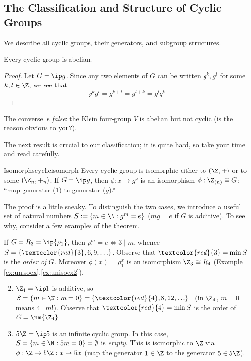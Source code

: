 \clearpage




\subsection{The Classification and Structure of Cyclic Groups}\label{sec:cyclicclass}

We describe all cyclic groups, their generators, and subgroup structures.

\begin{lemm}{}{}
	Every cyclic group is abelian.
\end{lemm}

\begin{proof}
	Let $G=\ip g$. Since any two elements of $G$ can be written $g^k,g^l$ for some $k,l\in\Z$, we see that
	\[
		g^kg^l=g^{k+l}=g^{l+k}=g^lg^k\tag*{\qedhere}
	\]
\end{proof}

The converse is \emph{false}: the Klein four-group $V$ is abelian but not cyclic (is the reason obvious to you?).\smallbreak

The next result is crucial to our classification; it is quite hard, so take your time and read carefully.


\begin{thm}{Isomorphs}{cyclicisomorph}
	Every cyclic group is isomorphic either to $(\Z,+)$ or to some $(\Z_n,+_n)$.\smallbreak
	If $G=\ip g$, then $\phi:x\mapsto g^x$ is an isomorphism $\phi:\Z_{(n)}\cong G$: ``map generator (1) to generator ($g$).''
\end{thm}

The proof is a little sneaky. To distinguish the two cases, we introduce a useful set of natural numbers $S:=\{m\in\N:g^m=e\}$ ($mg=e$ if $G$ is additive). To see why, consider a few examples of the theorem.

\begin{examples}{}{}
	\exstart If $G=R_3=\ip{\rho_1}$, then $\rho_1^m=e\iff 3\mid m$, whence $S=\{\textcolor{red}{3},6,9,\ldots\}$. Observe that $\textcolor{red}{3}=\min S$ is the \emph{order of $G$.} Moreover $\phi(x)=\rho_1^x$ is an isomorphism $\Z_3\cong R_4$ (Example \ref*{ex:unisoex}.\ref{ex:unisoex2}).
	\begin{enumerate}\setcounter{enumi}{1}
	  \item $\Z_4=\ip 1$ is additive, so $S=\{m\in\N:m=0\}=\{\textcolor{red}{4},8,12,\ldots\}$ \ (in $\Z_4$, $m=0$ means $4\mid m$!). Observe that $\textcolor{red}{4}=\min S$ is the order of $G=\nm{\Z_4}$.
	  \item $5\Z=\ip 5$ is an infinite cyclic group. In this case, $S=\{m\in\N:5m=0\}=\emptyset$ is \emph{empty}. This is isomorphic to $\Z$ via $\phi:\Z\to 5\Z:x\mapsto 5x$ (map the generator $1\in\Z$ to the generator $5\in 5\Z$).
	\end{enumerate}
\end{examples}

